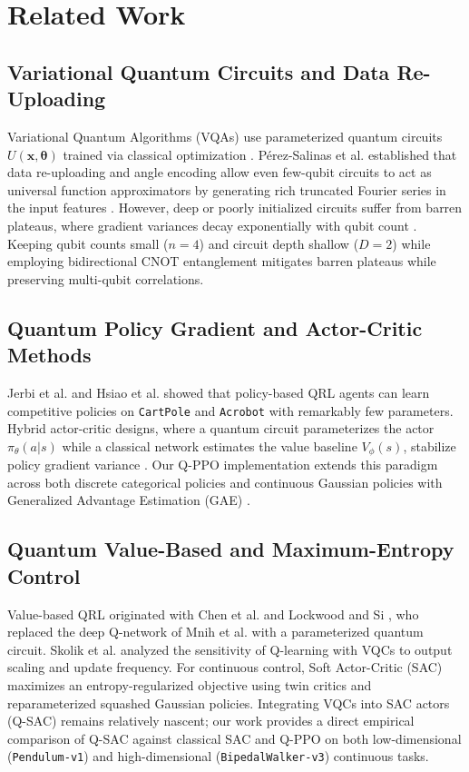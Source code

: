 \documentclass[conference]{IEEEtran}
\begin{document}
\section{Related Work}
\subsection{Variational Quantum Circuits and Data Re-Uploading}
Variational Quantum Algorithms (VQAs) use parameterized quantum circuits $U(\mathbf{x}, \boldsymbol{\theta})$ trained via classical optimization \cite{cerezo2021variational}. P\'{e}rez-Salinas et al. \cite{perez2020data} established that data re-uploading and angle encoding allow even few-qubit circuits to act as universal function approximators by generating rich truncated Fourier series in the input features \cite{schuld2021effect}. However, deep or poorly initialized circuits suffer from barren plateaus, where gradient variances decay exponentially with qubit count \cite{mcclean2018barren}. Keeping qubit counts small ($n=4$) and circuit depth shallow ($D=2$) while employing bidirectional CNOT entanglement mitigates barren plateaus while preserving multi-qubit correlations.

\subsection{Quantum Policy Gradient and Actor-Critic Methods}
Jerbi et al. \cite{jerbi2021parametrized} and Hsiao et al. \cite{hsiao2022unentangled} showed that policy-based QRL agents can learn competitive policies on \texttt{CartPole} and \texttt{Acrobot} with remarkably few parameters. Hybrid actor-critic designs, where a quantum circuit parameterizes the actor $\pi_\theta(a|s)$ while a classical network estimates the value baseline $V_\phi(s)$, stabilize policy gradient variance \cite{kölle2024quantum}. Our Q-PPO implementation extends this paradigm across both discrete categorical policies and continuous Gaussian policies with Generalized Advantage Estimation (GAE) \cite{schulman2015high}.

\subsection{Quantum Value-Based and Maximum-Entropy Control}
Value-based QRL originated with Chen et al. \cite{chen2020variational} and Lockwood and Si \cite{lockwood2020reinforcement}, who replaced the deep Q-network of Mnih et al. \cite{mnih2015human} with a parameterized quantum circuit. Skolik et al. \cite{skolik2022quantum} analyzed the sensitivity of Q-learning with VQCs to output scaling and update frequency. For continuous control, Soft Actor-Critic (SAC) \cite{haarnoja2018soft} maximizes an entropy-regularized objective using twin critics and reparameterized squashed Gaussian policies. Integrating VQCs into SAC actors (Q-SAC) remains relatively nascent; our work provides a direct empirical comparison of Q-SAC against classical SAC and Q-PPO on both low-dimensional (\texttt{Pendulum-v1}) and high-dimensional (\texttt{BipedalWalker-v3}) continuous tasks.
\end{document}
